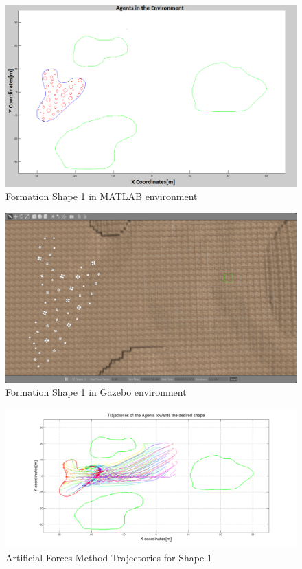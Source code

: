 \begin{figure}[H]
\caption{Formation Shape 1 in MATLAB environment}
\centerline{\includegraphics[scale = 0.32]{Trajectories_Formation_Shape_1_2}}
\end{figure} 	
			
\begin{figure}[H]
\caption{Formation Shape 1 in Gazebo environment}
\centerline{\includegraphics[scale = 0.32]{Trajectories_Formation_Shape_1_1}}
\end{figure} 	
		
\begin{figure}[H]
\caption{Artificial Forces Method Trajectories for Shape 1} \label{arto1}
\centerline{\includegraphics[scale = 0.32]{Aritificial_Trajecories_1}}
\end{figure} 	

